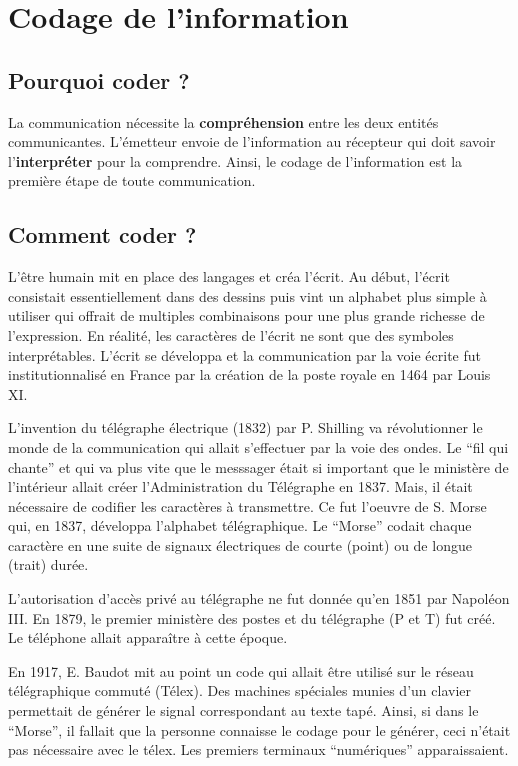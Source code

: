 \chapter{Codage de l'information}
\section{Pourquoi coder ?}
La communication nécessite la \textbf{compréhension} entre les deux entités communicantes. L'émetteur
envoie de l'information au récepteur qui doit savoir l'\textbf{interpréter} pour la comprendre. Ainsi,
le codage de l'information est la première étape de toute communication.
\section{Comment coder ?}
L'être humain mit en place des langages et créa l'écrit. Au début, l'écrit consistait
essentiellement dans des dessins puis vint un alphabet plus simple à utiliser qui offrait de
multiples combinaisons pour une plus grande richesse de l'expression. En réalité, les
caractères de l'écrit ne sont que des symboles interprétables. L'écrit se développa et la
communication par la voie écrite fut institutionnalisé en France par la création de la poste
royale en 1464 par Louis XI.

L'invention du télégraphe électrique (1832) par P. Shilling va révolutionner le monde de la
communication qui allait s'effectuer par la voie des ondes. Le ``fil qui chante'' et qui va
plus vite que le messsager était si important que le ministère de l'intérieur allait créer
l'Administration du Télégraphe en 1837. Mais, il était nécessaire de codifier les caractères à
	transmettre. Ce fut l'oeuvre de S. Morse qui, en 1837, développa l'alphabet télégraphique. Le
	``Morse'' codait chaque caractère en une suite de signaux électriques de courte (point) ou de
	longue (trait) durée.

	L'autorisation d'accès privé au télégraphe ne fut donnée qu'en 1851 par Napoléon III. En 1879,
	le premier ministère des postes et du télégraphe (P et T) fut créé. Le téléphone allait
	apparaître à cette époque.

	En 1917, E. Baudot mit au point un code qui allait être utilisé sur le réseau télégraphique
	commuté (Télex). Des machines spéciales munies d'un clavier permettait de générer le signal
	correspondant au texte tapé. Ainsi, si dans le ``Morse'', il fallait que la personne connaisse
	le codage pour le générer, ceci n'était pas nécessaire avec le télex. Les premiers terminaux
	``numériques'' apparaissaient.

